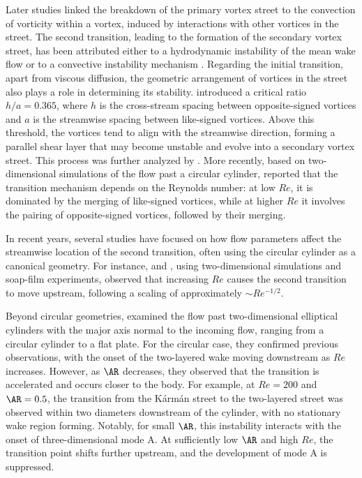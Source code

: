 Later studies \citep[e.g.][]{durgin-karlsson-1971,karasudani-funakoshi-1994,dynnikova-guverntuk-2016} linked the breakdown of the primary vortex street to the convection of vorticity within a vortex, induced by interactions with other vortices in the street. The second transition, leading to the formation of the secondary vortex street, has been attributed either to a hydrodynamic instability of the mean wake flow \citep{cimbala-nagib-roshko-1988,williamson-prasad-1993} or to a convective instability mechanism \citep{kumar-mittal-2012}. Regarding the initial transition, apart from viscous diffusion, the geometric arrangement of vortices in the street also plays a role in determining its stability. \citet{durgin-karlsson-1971} introduced a critical ratio $h/a = 0.365$, where $h$ is the cross-stream spacing between opposite-signed vortices and $a$ is the streamwise spacing between like-signed vortices. Above this threshold, the vortices tend to align with the streamwise direction, forming a parallel shear layer that may become unstable and evolve into a secondary vortex street. This process was further analyzed by \citet{karasudani-funakoshi-1994}. More recently, based on two-dimensional simulations of the flow past a circular cylinder, \citet{jiang-cheng-2019} reported that the transition mechanism depends on the Reynolds number: at low $Re$, it is dominated by the merging of like-signed vortices, while at higher $Re$ it involves the pairing of opposite-signed vortices, followed by their merging.

In recent years, several studies have focused on how flow parameters affect the streamwise location of the second transition, often using the circular cylinder as a canonical geometry. For instance, \citet{inoue-yamazaki-1999} and \citet{vorobieff-etal-2002}, using two-dimensional simulations and soap-film experiments, observed that increasing $Re$ causes the second transition to move upstream, following a scaling of approximately $\sim Re^{-1/2}$.

Beyond circular geometries, \citet{thompson-etal-2014} examined the flow past two-dimensional elliptical cylinders with the major axis normal to the incoming flow, ranging from a circular cylinder to a flat plate. For the circular case, they confirmed previous observations, with the onset of the two-layered wake moving downstream as $Re$ increases. However, as $\AR$ decreases, they observed that the transition is accelerated and occurs closer to the body. For example, at $Re = 200$ and $\AR = 0.5$, the transition from the Kármán street to the two-layered street was observed within two diameters downstream of the cylinder, with no stationary wake region forming. Notably, for small $\AR$, this instability interacts with the onset of three-dimensional mode A. At sufficiently low $\AR$ and high $Re$, the transition point shifts further upstream, and the development of mode A is suppressed.

